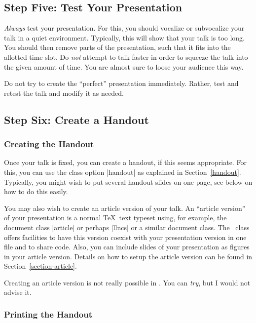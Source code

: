 \subsection{Step Five: Test Your Presentation}

\emph{Always} test your presentation. For this, you should
vocalize or subvocalize your talk in a quiet environment. Typically,
this will show that your talk is too long. You should then remove
parts of the presentation, such that it fits into the allotted time
slot. Do \emph{not} attempt to talk faster in order to squeeze the
talk into the given amount of time. You are almost sure to loose your
audience this way.

Do not try to create the ``perfect'' presentation immediately. Rather,
test and retest the talk and modify it as needed.




\subsection{Step Six: Create a Handout}

\subsubsection{Creating the Handout}

Once your talk is fixed, you can create a handout, if this seems
appropriate. For this, you can use the class option |handout| as
explained in Section~\ref{handout}. Typically, you might wish
to put several handout slides on one page, see below on how to do
this easily.

You may also wish to create an article version of your talk. An
``article version'' of your presentation is a normal \TeX\ text
typeset using, for example, the document class |article| or perhaps
|llncs| or a similar document class. The \beamer\ class offers
facilities to have this version coexist with your presentation version
in one file and to share code. Also, you can include slides of your
presentation as figures in your article version. Details on how to
setup the article version can be found in
Section~\ref{section-article}.

\lyxnote
Creating an article version is not really possible in \LyX. You
can \emph{try}, but I would not advise it.


\subsubsection{Printing the Handout}
\label{section-printing-version}

